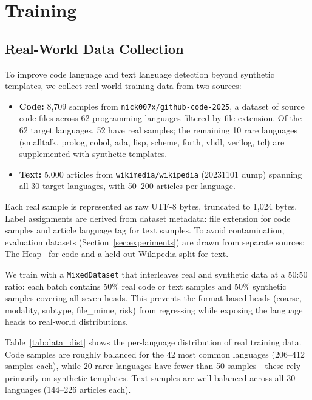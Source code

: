 \documentclass[11pt,a4paper]{article}
\begin{document}
\section{Training}
\label{sec:training}

\subsection{Real-World Data Collection}

To improve code language and text language detection beyond synthetic templates, we collect real-world training data from two sources:

\begin{itemize}[noitemsep]
  \item \textbf{Code:} 8,709 samples from \texttt{nick007x/github-code-2025}, a dataset of source code files across 62 programming languages filtered by file extension.
    Of the 62 target languages, 52 have real samples; the remaining 10 rare languages (smalltalk, prolog, cobol, ada, lisp, scheme, forth, vhdl, verilog, tcl) are supplemented with synthetic templates.
  \item \textbf{Text:} 5,000 articles from \texttt{wikimedia/wikipedia} (20231101 dump) spanning all 30 target languages, with 50--200 articles per language.
\end{itemize}

Each real sample is represented as raw UTF-8 bytes, truncated to 1,024 bytes.
Label assignments are derived from dataset metadata: file extension for code samples and article language tag for text samples.
To avoid contamination, evaluation datasets (Section~\ref{sec:experiments}) are drawn from separate sources: The Heap~\cite{theheap} for code and a held-out Wikipedia split for text.

We train with a \texttt{MixedDataset} that interleaves real and synthetic data at a 50:50 ratio: each batch contains 50\% real code or text samples and 50\% synthetic samples covering all seven heads.
This prevents the format-based heads (coarse, modality, subtype, file\_mime, risk) from regressing while exposing the language heads to real-world distributions.

Table~\ref{tab:data_dist} shows the per-language distribution of real training data.
Code samples are roughly balanced for the 42 most common languages (206--412 samples each), while 20 rarer languages have fewer than 50 samples---these rely primarily on synthetic templates.
Text samples are well-balanced across all 30 languages (144--226 articles each).
\end{document}

